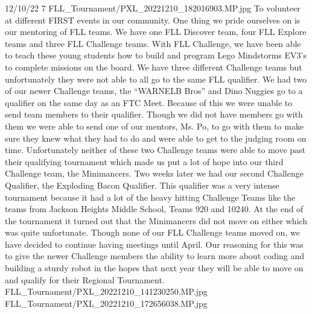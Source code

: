 {12/10/22}
{7}
{FLL_Tournament/PXL_20221210_182016903.MP.jpg}
{To volunteer at different FIRST events in our community.} 
{One thing we pride ourselves on is our mentoring of FLL teams. We have one FLL Discover team, four FLL Explore teams and three FLL Challenge teams. With FLL Challenge, we have been able to teach these young students how to build and program Lego Mindstorms EV3’s to complete missions on the board. We have three different Challenge teams but unfortunately they were not able to all go to the same FLL qualifier. We had two of our newer Challenge teams, the “WARNELB Bros” and Dino Nuggies go to a qualifier on the same day as an FTC Meet. Because of this we were unable to send team members to their qualifier. Though we did not have members go with them we were able to send one of our mentors, Ms. Po, to go with them to make sure they knew what they had to do and were able to get to the judging room on time. Unfortunately neither of these two Challenge teams were able to move past their qualifying tournament which made us put a lot of hope into our third Challenge team, the Minimancers. Two weeks later we had our second Challenge Qualifier, the Exploding Bacon Qualifier. This qualifier was a very intense tournament because it had a lot of the heavy hitting Challenge Teams like the teams from Jackson Heights Middle School, Teams 920 and 10240. At the end of the tournament it turned out that the Minimancers did not move on either which was quite unfortunate. Though none of our FLL Challenge teams moved on, we have decided to continue having meetings until April. Our reasoning for this was to give the newer Challenge members the ability to learn more about coding and building a sturdy robot in the hopes that next year they will be able to move on and qualify for their Regional Tournament.
} 
{FLL_Tournament/PXL_20221210_141230250.MP.jpg}
{FLL_Tournament/PXL_20221210_172656038.MP.jpg}
